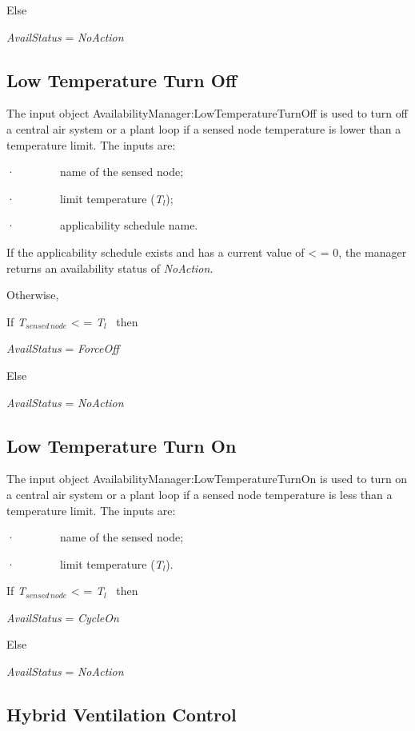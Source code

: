 Else

\emph{AvailStatus} = \emph{NoAction}

\subsection{Low Temperature Turn Off}\label{low-temperature-turn-off}

The input object AvailabilityManager:LowTemperatureTurnOff is used to turn off a central air system or a plant loop if a sensed node temperature is lower than a temperature limit. The inputs are:

·~~~~~~~~name of the sensed node;

·~~~~~~~~limit temperature (\emph{T\(_{l}\)});

·~~~~~~~~applicability schedule name.

If the applicability schedule exists and has a current value of \textless{} = 0, the manager returns an availability status of \emph{NoAction}.

Otherwise,

If \emph{T\(_{sensed\, node}\)} \textless{} = \emph{T\(_{l}\)}~ then

\emph{AvailStatus} = \emph{ForceOff}

Else

\emph{AvailStatus} = \emph{NoAction}

\subsection{Low Temperature Turn On}\label{low-temperature-turn-on}

The input object AvailabilityManager:LowTemperatureTurnOn is used to turn on a central air system or a plant loop if a sensed node temperature is less than a temperature limit. The inputs are:

·~~~~~~~~name of the sensed node;

·~~~~~~~~limit temperature (\emph{T\(_{l}\)}).

If \emph{T\(_{sensed\, node}\)} \textless{} = \emph{T\(_{l}\)}~ then

\emph{AvailStatus} = \emph{CycleOn}

Else

\emph{AvailStatus} = \emph{NoAction}

\subsection{Hybrid Ventilation Control}\label{hybrid-ventilation-control}

